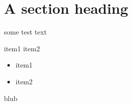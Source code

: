 \documentclass{report}
\begin{document}
\section{A section heading}
some test text

\begin{tasks}
  \task item1
  \task item2
\end{tasks}

\begin{itemize}
  \item item1
  \item item2
\end{itemize}

\NewCoffin\MyCoffin
\SetHorizontalCoffin{}
\TypesetCoffin\MyCoffin

\normalcolor blub
\end{document}
